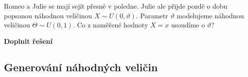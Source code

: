 \documentclass[../main.tex]{subfiles}
\begin{document}
\begin{example}
    Romeo a Julie se mají sejít přesně v poledne. Julie ale přijde pozdě o dobu popsanou náhodnou veličinou $X \sim U(0, \vartheta)$.
    Parametr $\vartheta$ modelujeme náhodnou veličinou $\Theta \sim U(0,1)$. Co z naměřené hodnoty $X = x$ usoudíme o $\vartheta$?
    
    \textbf{Doplnit řešení}
\end{example}

\subsection{Generování náhodných veličin}
\end{document}
